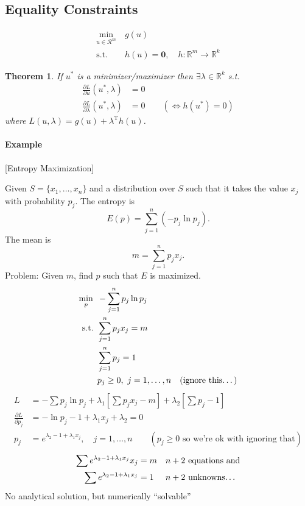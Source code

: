 \documentclass[letterpaper,12pt,titlepage]{report}
\newcommand{\trans}{^\text{T}}
\newcommand*\pder[2]{\frac{\partial #1}{\partial #2}}
\newcommand*\R{\mathbb{R}}
\theoremstyle{plain}
\newtheorem*{thm}{Theorem}
\theoremstyle{definition}
\begin{document}
\subsection{Equality Constraints}
\begin{align}
  \min_{u\in\mathcal R^m} {}\ & g(u) \\
  \text{s.t. } & h(u)=\bm 0, \quad h:\R^m\to\R^k
\end{align}
\begin{thm}
  If $u^*$ is a minimizer/maximizer then $\exists\lambda\in\R^k$ s.t.
  \begin{align}
    \pder{L}{u}(u^*,\lambda) &= 0 \\
    \pder{L}{\lambda}(u^*,\lambda) &= 0 \qquad (\Longleftrightarrow h(u^*)=0)
  \end{align}
  where $L(u,\lambda) = g(u) + \lambda\trans h(u)$.
\end{thm}

\paragraph{Example} [Entropy Maximization]

Given $S=\{x_1,\dots,x_n\}$ and a distribution over $S$ such that it takes the value $x_j$ with probability $p_j$. The entropy is
\[ E(p) = \sum_{j=1}^n (-p_j \ln p_j). \]
The mean is
\[ m = \sum_{j=1}^n p_jx_j. \]
Problem: Given $m$, find $p$ such that $E$ is maximized.
\begin{align}
  \min_{p} {}\ & -\sum_{j=1}^n p_j \ln p_j \\
  \text{s.t. } & \sum_{j=1}^n p_j x_j = m \\
               & \sum_{j=1}^n p_j = 1 \\
               & p_j \ge 0, \ j=1,\dots,n \quad \text{(ignore this\dots)}
\end{align}
\begin{align}
  L &= - \sum p_j \ln p_j + \lambda_1 \left[ \sum p_j x_j -m \right] + \lambda_2 \left[ \sum p_j - 1 \right] \\
  \pder{L}{p_j} &= -\ln p_j - 1 + \lambda_1 x_j + \lambda_2 = 0 \\
  p_j &= e^{\lambda_2 - 1 + \lambda_1 x_j}, \quad j=1,\dots,n \qquad (p_j\ge0 \text{ so we're ok with ignoring that})
\end{align}
\begin{align}
  \sum e^{\lambda_2 - 1 + \lambda_1 x_j} x_j &= m && n+2 \text{ equations and} \\
  \sum e^{\lambda_2 - 1 + \lambda_1 x_j} &= 1 && n+2 \text{ unknowns\dots}
\end{align}
No analytical solution, but numerically ``solvable''
\end{document}

